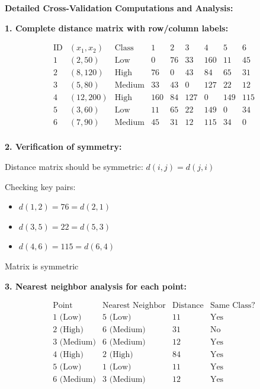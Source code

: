 \documentclass[12pt]{article}
\begin{document}
\begin{computation}
\textbf{Detailed Cross-Validation Computations and Analysis:}

\textbf{1. Complete distance matrix with row/column labels:}

\[
\begin{array}{c|c|c|cccccc}
\text{ID} & (x_1, x_2) & \text{Class} & 1 & 2 & 3 & 4 & 5 & 6 \\
\hline
1 & (2, 50) & \text{Low} & 0 & 76 & 33 & 160 & 11 & 45 \\
2 & (8, 120) & \text{High} & 76 & 0 & 43 & 84 & 65 & 31 \\
3 & (5, 80) & \text{Medium} & 33 & 43 & 0 & 127 & 22 & 12 \\
4 & (12, 200) & \text{High} & 160 & 84 & 127 & 0 & 149 & 115 \\
5 & (3, 60) & \text{Low} & 11 & 65 & 22 & 149 & 0 & 34 \\
6 & (7, 90) & \text{Medium} & 45 & 31 & 12 & 115 & 34 & 0 \\
\end{array}
\]

\textbf{2. Verification of symmetry:}

Distance matrix should be symmetric: \(d(i,j) = d(j,i)\)

Checking key pairs:
\begin{itemize}
    \item \(d(1,2) = 76 = d(2,1)\) \checkmark
    \item \(d(3,5) = 22 = d(5,3)\) \checkmark
    \item \(d(4,6) = 115 = d(6,4)\) \checkmark
\end{itemize}

Matrix is symmetric \checkmark

\textbf{3. Nearest neighbor analysis for each point:}

\[
\begin{array}{c|c|c|c}
\text{Point} & \text{Nearest Neighbor} & \text{Distance} & \text{Same Class?} \\
\hline
1 \text{ (Low)} & 5 \text{ (Low)} & 11 & \text{Yes} \\
2 \text{ (High)} & 6 \text{ (Medium)} & 31 & \text{No} \\
3 \text{ (Medium)} & 6 \text{ (Medium)} & 12 & \text{Yes} \\
4 \text{ (High)} & 2 \text{ (High)} & 84 & \text{Yes} \\
5 \text{ (Low)} & 1 \text{ (Low)} & 11 & \text{Yes} \\
6 \text{ (Medium)} & 3 \text{ (Medium)} & 12 & \text{Yes} \\
\end{array}
\]


\end{computation}
\end{document}

